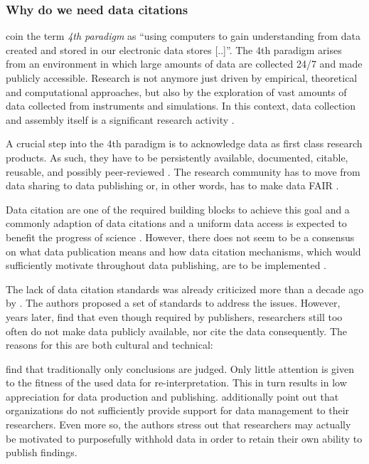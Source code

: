 \documentclass[a4paper,10pt]{article}
\begin{document}
\subsubsection{Why do we need data citations}    
\cite{Hey2009} coin the term \textit{4th paradigm} as ``using computers to gain understanding from data created and stored in our electronic data stores [..]''.
The 4th paradigm arises from an environment in which large amounts of data are collected 24/7 and made publicly accessible. Research is not anymore just driven by empirical, theoretical and computational approaches, but also by the exploration of vast amounts of data collected from instruments and simulations. In this context, data collection and assembly itself is a significant research activity \citep{Frew2012}.

A crucial step into the 4th paradigm is to acknowledge data as first class research products. As such, they have to be persistently available, documented, citable, reusable, and possibly peer-reviewed \citep{Callaghan2012, Kratz2014}. The research community has to move from data sharing to data publishing \citep{Costello2009, Kratz2014} or, in other words, has to make data \gls{FAIR} \citep{Wilkinson2016}. 

Data citation are one of the required building blocks to achieve this goal and a commonly adaption of data citations and a uniform data access is expected to benefit the progress of science \citep{CODATA2013}. However, there does not seem to be a consensus on what data publication means \citep{Kratz2014} and how data citation mechanisms, which would sufficiently motivate throughout data publishing, are to be implemented \citep{Costello2009}.

The lack of data citation standards was already criticized more than a decade ago by \cite{AltKin07}. The authors proposed a set of standards to address the issues. However, years later, \cite{Altman2015, Tenopir2011} find that even though required by publishers, researchers still too often do not make data publicly available, nor cite the data consequently. The reasons for this are both cultural and technical: 

\cite{Lawrence2011} find that traditionally only conclusions are judged. Only little attention is given to the fitness of the used data for re-interpretation. This in turn results in low appreciation for data production and publishing. \cite{Tenopir2011} additionally point out that organizations do not sufficiently provide support for data management to their researchers. Even more so, the authors stress out that researchers may actually be motivated to purposefully withhold data in order to retain their own ability to publish findings.
\end{document}
